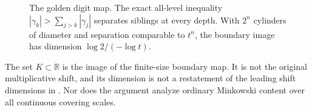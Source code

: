 \begin{figure}[t]
  \centering
  \resizebox{\textwidth}{!}{}
  \caption{The golden digit map.  The exact all-level inequality
  \(|\gamma_k|>\sum_{j>k}|\gamma_j|\) separates siblings at every depth.
  With \(2^n\) cylinders of diameter and separation comparable to \(t^n\),
  the boundary image has dimension \(\log2/(-\log t)\).}
  \label{fig:golden-cylinders}
\end{figure}

\begin{remark}
The set \(K\subset\mathbb R\) is the image of the finite-size boundary map.
It is not the original multiplicative shift, and its dimension is not a
restatement of the leading shift dimensions in
\citep{fan2012level,kenyon2012hausdorff}.  Nor does the argument analyze
ordinary Minkowski content over all continuous covering scales.
\end{remark}
